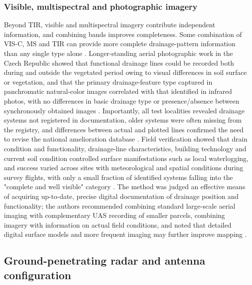 \documentclass[11pt]{article}
\begin{document}
\subsubsection{Visible, multispectral and photographic imagery}

Beyond TIR, visible and multispectral imagery contribute independent information, and combining bands improves completeness. Some combination of VIS-C, MS and TIR can provide more complete drainage-pattern information than any single type alone \parencite{Allred2020}. Longer-standing aerial photographic work in the Czech Republic showed that functional drainage lines could be recorded both during and outside the vegetated period owing to visual differences in soil surface or vegetation, and that the primary drainage-feature type captured in panchromatic natural-color images correlated with that identified in infrared photos, with no differences in basic drainage type or presence/absence between synchronously obtained images \parencite{Tlapáková2017}. Importantly, all test localities revealed drainage systems not registered in documentation, older systems were often missing from the registry, and differences between actual and plotted lines confirmed the need to revise the national amelioration database \parencite{Tlapáková2017}. Field verification showed that drain condition and functionality, drainage-line characteristics, building technology and current soil condition controlled surface manifestations such as local waterlogging, and success varied across sites with meteorological and spatial conditions during survey flights, with only a small fraction of identified systems falling into the "complete and well visible" category \parencite{Tlapáková2017}. The method was judged an effective means of acquiring up-to-date, precise digital documentation of drainage position and functionality; the authors recommended combining standard large-scale aerial imaging with complementary UAS recording of smaller parcels, combining imagery with information on actual field conditions, and noted that detailed digital surface models and more frequent imaging may further improve mapping \parencite{Tlapáková2017}.

\subsection{Ground-penetrating radar and antenna configuration}
\end{document}
